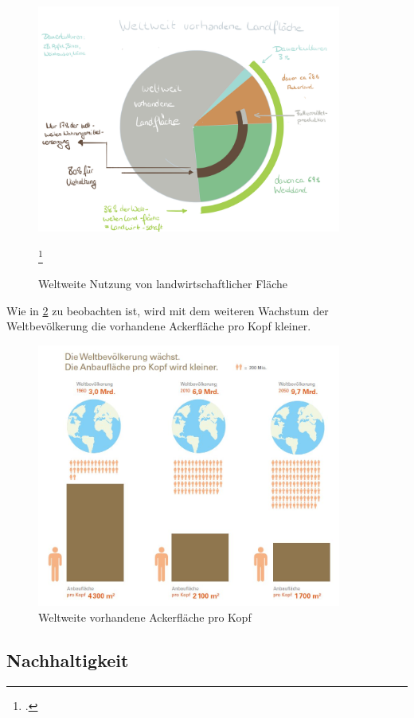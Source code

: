\documentclass{scrartcl}
\begin{document}
\begin{figure}[htbp]
\centering
\includegraphics[width=10cm]{image_folder/LFlaeche.png}
\caption{Weltweite Nutzung von landwirtschaftlicher Fläche}
\label{fig:lFlaeche}\footcite[Eigene Darstellung in Anlehnung an]{2008FAOSTAT}
\end{figure}

Wie in \ref{fig:AckerproKopf} zu beobachten ist, wird mit dem weiteren Wachstum der Weltbevölkerung die vorhandene Ackerfläche pro Kopf kleiner. 

\begin{figure}[htbp]
\centering
\includegraphics[width=10cm]{image_folder/weltbevoelkerung_anbauflaeche_pro_kopf.jpg}
\caption{Weltweite vorhandene Ackerfläche pro Kopf}
\label{fig:AckerproKopf}
\end{figure}

\subsection{Nachhaltigkeit}
\end{document}
